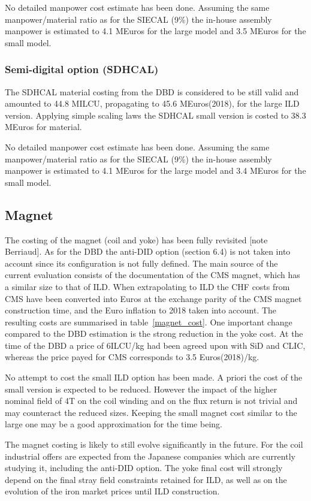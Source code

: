 No detailed manpower cost estimate has been done. Assuming the same manpower/material ratio as for the SIECAL (9\%) the in-house assembly manpower is estimated to 4.1 MEuros for the large model and 3.5 MEuros for the small model.

\subsubsection{Semi-digital option (SDHCAL)}

The SDHCAL material costing from the DBD is considered to be still valid and amounted to 44.8 MILCU, propagating to 45.6 MEuros(2018), for the large ILD version. Applying simple scaling laws the SDHCAL small version is costed to 38.3 MEuros for material.

No detailed manpower cost estimate has been done. Assuming the same manpower/material ratio as for the SIECAL (9\%) the in-house assembly manpower is estimated to 4.1 MEuros for the large model and 3.4 MEuros for the small model.

\subsection{Magnet}
The costing of the magnet (coil and yoke) has been fully revisited [note Berriaud]. As for the DBD the anti-DID option (section 6.4) is not taken into account since its configuration is not fully defined. The main source of the current evaluation consists of the documentation of the CMS magnet, which has a similar size to that of ILD. When extrapolating to ILD the CHF costs from CMS have been converted into Euros at the exchange parity of the CMS magnet construction time, and the Euro inflation to 2018 taken into account. The resulting costs are summarised in table~\ref{magnet_cost}. One important change compared to the DBD estimation is the strong reduction in the yoke cost. At the time of the DBD a price of 6ILCU/kg had been agreed upon with SiD and CLIC, whereas the price payed for CMS corresponds to 3.5 Euros(2018)/kg. 

No attempt to cost the small ILD option has been made. A priori the cost of the small version is expected to be reduced. However the impact of the higher nominal field of 4T on the coil winding and on the flux return is not trivial and may counteract the reduced sizes. Keeping the small magnet cost similar to the large one may be a good approximation for the time being.

The magnet costing is likely to still evolve significantly in the future. For the coil industrial offers are expected from the Japanese companies which are currently studying it, including the anti-DID option. The yoke final cost will strongly depend on the final stray field constraints retained for ILD, as well as on the evolution of the iron market prices until ILD construction.

